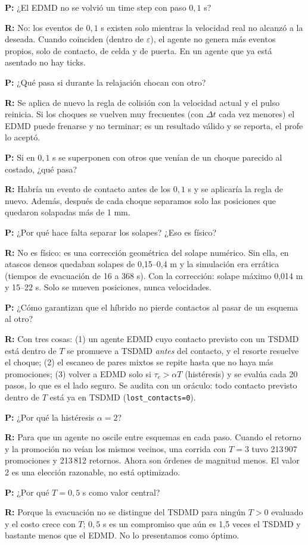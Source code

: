 \documentclass[10.5pt,a4paper]{article}
\newcommand{\pr}[1]{\par\textbf{P:} #1\par\nobreak}
\newcommand{\rp}[1]{\textbf{R:} #1\par}
\begin{document}
\pr{¿El EDMD no se volvió un time step con paso $0{,}1$ s?}
\rp{No: los eventos de $0{,}1$ s existen solo mientras la velocidad real no alcanzó a la deseada. Cuando coinciden (dentro de $\varepsilon$), el agente no genera más eventos propios, solo de contacto, de celda y de puerta. En un agente que ya está asentado no hay ticks.}

\pr{¿Qué pasa si durante la relajación chocan con otro?}
\rp{Se aplica de nuevo la regla de colisión con la velocidad actual y el pulso reinicia. Si los choques se vuelven muy frecuentes (con $\Delta t$ cada vez menores) el EDMD puede frenarse y no terminar; es un resultado válido y se reporta, el profe lo aceptó.}

\pr{Si en $0{,}1$ s se superponen con otros que venían de un choque parecido al costado, ¿qué pasa?}
\rp{Habría un evento de contacto antes de los $0{,}1$ s y se aplicaría la regla de nuevo. Además, después de cada choque separamos solo las posiciones que quedaron solapadas más de 1 mm.}

\pr{¿Por qué hace falta separar los solapes? ¿Eso es físico?}
\rp{No es físico: es una corrección geométrica del solape numérico. Sin ella, en atascos densos quedaban solapes de 0,15--0,4 m y la simulación era errática (tiempos de evacuación de 16 a 368 s). Con la corrección: solape máximo 0,014 m y 15--22 s. Solo se mueven posiciones, nunca velocidades.}

\pr{¿Cómo garantizan que el híbrido no pierde contactos al pasar de un esquema al otro?}
\rp{Con tres cosas: (1) un agente EDMD cuyo contacto previsto con un TSDMD está dentro de $T$ se promueve a TSDMD \emph{antes} del contacto, y el resorte resuelve el choque; (2) el escaneo de pares mixtos se repite hasta que no haya más promociones; (3) volver a EDMD solo si $\tau_c>\alpha T$ (histéresis) y se evalúa cada 20 pasos, lo que es el lado seguro. Se audita con un oráculo: todo contacto previsto dentro de $T$ está ya en TSDMD (\texttt{lost\_contacts=0}).}

\pr{¿Por qué la histéresis $\alpha=2$?}
\rp{Para que un agente no oscile entre esquemas en cada paso. Cuando el retorno y la promoción no veían los mismos vecinos, una corrida con $T=3$ tuvo 213\,907 promociones y 213\,812 retornos. Ahora son órdenes de magnitud menos. El valor 2 es una elección razonable, no está optimizado.}

\pr{¿Por qué $T=0{,}5$ s como valor central?}
\rp{Porque la evacuación no se distingue del TSDMD para ningún $T>0$ evaluado y el costo crece con $T$; $0{,}5$ s es un compromiso que aún es 1,5 veces el TSDMD y bastante menos que el EDMD. No lo presentamos como óptimo.}
\end{document}
